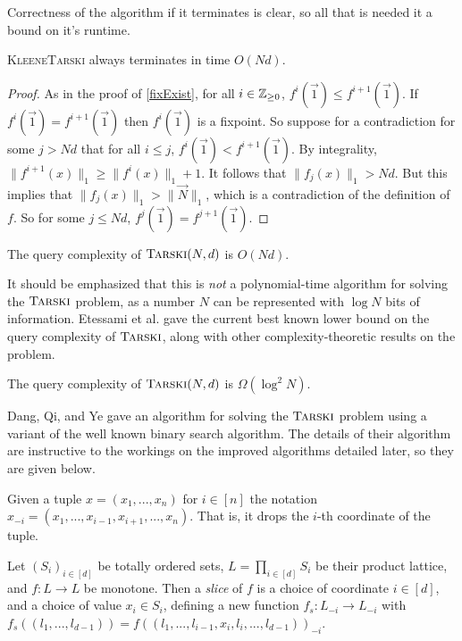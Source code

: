 Correctness of the algorithm if it terminates is clear, so all that is needed it a bound on it's runtime.
\begin{lemma}
  \textsc{KleeneTarski} always terminates in time $O(Nd)$.
\end{lemma}
\begin{proof}
  As in the proof of \cref{fixExist}, for all $i \in \mathbb{Z}_{\geq 0}$, $f^i(\vec{1}) \leq f^{i+1}(\vec{1})$. If $f^i(\vec{1}) = f^{i+1}(\vec{1})$
  then $f^i(\vec{1})$ is a fixpoint. So suppose for a contradiction for some $j > Nd$ that for all $i \leq j$, $f^i(\vec{1}) < f^{i+1}(\vec{1})$. 
  By integrality, $\|f^{i+1}(x)\|_1 \geq \|f^i(x)\|_1 + 1$. It follows that $\|f_j(x)\|_1 > Nd$. But this implies that
  $\|f_j(x)\|_1 > \|\vec{N}\|_1$, which is a contradiction of the definition of $f$. So for some $j \leq Nd$, $f^j(\vec{1}) = f^{j+1}(\vec{1})$.
\end{proof}
\begin{theorem}
  The query complexity of $\textsc{Tarski}(N,d)$ is $O(Nd)$.
\end{theorem}
It should be emphasized that this is \emph{not} a polynomial-time algorithm for solving the $\textsc{Tarski}$ problem, as a number
$N$ can be represented with $\log N$ bits of information. 
Etessami et al. gave the current best known lower bound on the query complexity of $\textsc{Tarski}$, along with other complexity-theoretic results
on the problem.
\begin{theorem}
  The query complexity of $\textsc{Tarski}(N, d)$ is $\Omega(\log^2N)$.
\end{theorem}
Dang, Qi, and Ye gave an algorithm for solving the $\textsc{Tarski}$ problem\citep{dangQiYe} using a variant of the well
known binary search algorithm. The details of their algorithm are instructive
to the workings on the improved algorithms detailed  later, so they are given below.
\begin{notation}
  Given a tuple $x = (x_1, ..., x_n)$ for $i \in [n]$ the notation $x_{-i} = (x_1, ..., x_{i-1}, x_{i+1}, ..., x_n)$. That is, it drops
  the $i$-th coordinate of the tuple.
\end{notation}
\begin{definition}[Slice]
  Let $(S_i)_{i \in [d]}$ be totally ordered sets, $L = \prod_{i \in [d]} S_i$
  be their product lattice, and $f : L \to L$ be monotone. 
  Then a \emph{slice} of $f$ is a choice of coordinate $i \in [d]$,
  and a choice of value $x_i \in S_i$, defining a new function 
  $f_s : L_{-i} \to L_{-i}$ with
  $f_s((l_1, ..., l_{d-1})) = f((l_1, ..., l_{i-1},  x_i, l_i, ..., l_{d-1}))_{-i}$.
\end{definition}
